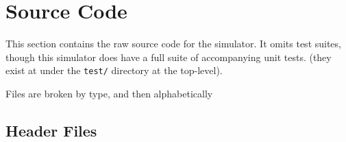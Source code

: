 \documentclass{article}
\begin{document}

\clearpage


\clearpage


\clearpage


\clearpage


\clearpage


\clearpage


\clearpage

\section{Source Code}

This section contains the raw source code for the simulator. It omits test
suites, though this simulator does have a full suite of accompanying unit tests.
(they exist at under the \texttt{test/} directory at the top-level).

Files are broken by type, and then alphabetically

\subsection{Header Files}
\end{document}
